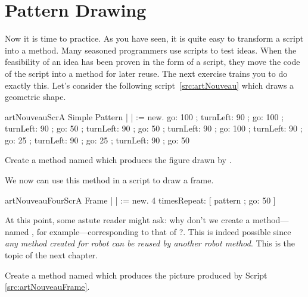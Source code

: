 {{{\section{Pattern Drawing}\label{sec:newart}
Now it is time to practice. As you have seen, it is quite easy to transform a script into a method.  Many seasoned programmers use scripts to test ideas. When the feasibility of an idea has been proven in the form of a script, they move the code of the script into a method for later reuse. The next exercise trains you to do exactly this.
\newcommand{\replace}[2]{Let us}{Let's} consider the following script~\ref{src:artNouveau} which draws a geometric shape. 
\begin{scriptfig}{artNouveauScr}{A Simple Pattern}\label{src:artNouveau}
| \caro |
\caro := \Turtle new.
\caro go: 100 ;
        turnLeft: 90 ;
        go: 100 ;
        turnLeft: 90 ;
        go: 50 ;
        turnLeft: 90 ;
        go: 50 ;
        turnLeft: 90 ;
        go: 100 ;
        turnLeft: 90 ;
        go: 25 ;
        turnLeft: 90 ;
        go: 25 ;
        turnLeft: 90 ;
        go: 50
\end{scriptfig}
\begin{exonofig} \label{exo:artNouveau}
Create a method named  which produces the \newcommand{\replace}[2]{drawing presented in Figure}{figure drawn by} .
\end{exonofig}
We now can use this method in a script to draw a frame.
\begin{scriptfig}{artNouveauFourScr}{A Frame} 
\label{src:artNouveauFrame}
| \caro |
\caro := \Turtle new.
4 timesRepeat: [ \caro pattern ; go: 50 ]
\end{scriptfig}
At this point, some astute reader might ask: why don't we create a
method---named , for example---corresponding to
that of \newcommand{\replace}[2]{}{?}. This is indeed possible
since \emph{any method created for \newcommand{\add}[1]{a} robot can be reused
by another \newcommand{\replace}[2]{turtle}{robot} method}. This is the topic of the next chapter. 
\begin{exonofig} \label{exo:artNouveauFrame50}
Create a method named  which produces the picture produced by Script \ref{src:artNouveauFrame}. 
\end{exonofig}

}}}
